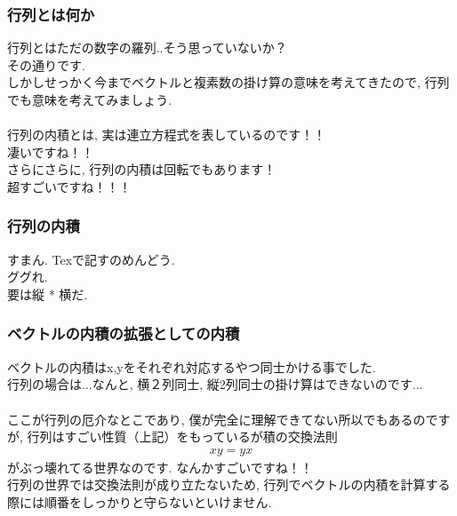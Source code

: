\documentclass[11pt,a4paper]{jsarticle}
\begin{document}
\subsubsection{行列とは何か}
行列とはただの数字の羅列..そう思っていないか？\\
その通りです.\\
しかしせっかく今までベクトルと複素数の掛け算の意味を考えてきたので, 行列でも意味を考えてみましょう.\\
\\
行列の内積とは, 実は連立方程式を表しているのです！！\\
凄いですね！！\\
さらにさらに, 行列の内積は回転でもあります！\\
超すごいですね！！！\\
\subsubsection{行列の内積}
すまん. Texで記すのめんどう. 
\\
ググれ.
\\
要は縦 * 横だ.\\

\subsubsection{ベクトルの内積の拡張としての内積}
ベクトルの内積はx,yをそれぞれ対応するやつ同士かける事でした.\\
行列の場合は...なんと, 横２列同士, 縦2列同士の掛け算はできないのです...\\
\\
ここが行列の厄介なとこであり, 僕が完全に理解できてない所以でもあるのですが, 行列はすごい性質（上記）をもっているが積の交換法則
\begin{eqnarray}
xy = yx
\end{eqnarray}
がぶっ壊れてる世界なのです. なんかすごいですね！！\\
行列の世界では交換法則が成り立たないため, 行列でベクトルの内積を計算する際には順番をしっかりと守らないといけません.\\
\end{document}
